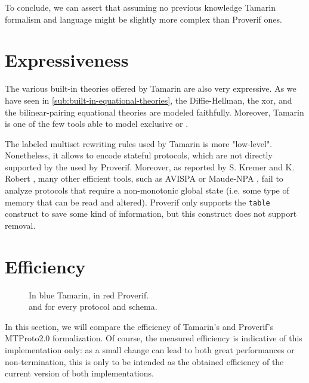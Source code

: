 To conclude, we can assert that assuming no previous knowledge Tamarin formalism and language might be slightly more complex than Proverif ones.

\section{Expressiveness}
The various built-in theories offered by Tamarin are also very expressive. As we have seen in \cref{sub:built-in-equational-theories}, the Diffie-Hellman, the xor, and the bilinear-pairing equational theories are modeled faithfully. Moreover, Tamarin is one of the few tools able to model exclusive or \cite{xor_tamarin}.

\lstset{language=proverif}
The labeled multiset rewriting rules used by Tamarin is more "low-level". Nonetheless, it allows to encode stateful protocols, which are not directly supported by the \Horncs{} used by Proverif. Moreover, as reported by S. Kremer and K. Robert \cite{kremer:hal-00955869}, many other efficient tools, such as AVISPA \cite{10.1007/11513988_27} or Maude-NPA \cite{Escobar2009}, fail to analyze protocols that require a non-monotonic global state (i.e. some type of memory that can be read and altered). Proverif only supports the \lstinline{table} construct to save some kind of information, but this construct does not support removal.

\section{Efficiency}

\begin{figure}
    \centering
    \hfill
    \caption{In blue Tamarin, in red Proverif.\\\Wct{} and \mrss{} for every protocol and schema.}
    \label{fig:efficiency}
\end{figure}

In this section, we will compare the efficiency of Tamarin's and Proverif's MTProto2.0 formalization. Of course, the measured efficiency is indicative of this implementation only: as a small change can lead to both great performances or non-termination, this is only to be intended as the obtained efficiency of the current version of both implementations.

